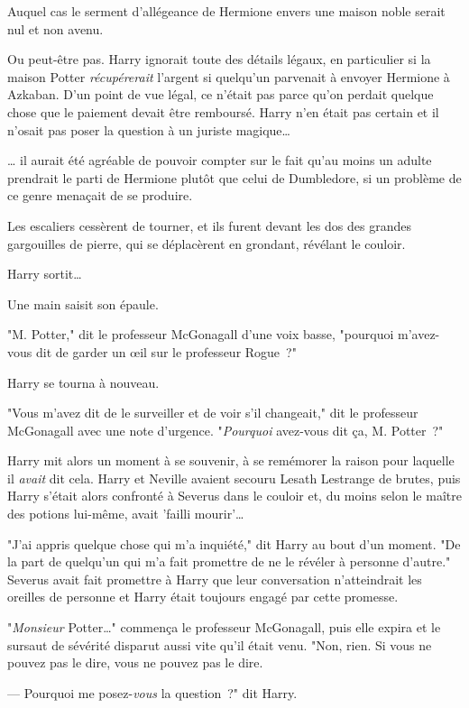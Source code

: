 Auquel cas le serment d'allégeance de Hermione envers une maison noble serait nul et non avenu.

Ou peut-être pas. Harry ignorait toute des détails légaux, en particulier si la maison Potter \emph{récupérerait} l'argent si quelqu'un parvenait à envoyer Hermione à Azkaban. D'un point de vue légal, ce n'était pas parce qu'on perdait quelque chose que le paiement devait être remboursé. Harry n'en était pas certain et il n'osait pas poser la question à un juriste magique…

… il aurait été agréable de pouvoir compter sur le fait qu'au moins un adulte prendrait le parti de Hermione plutôt que celui de Dumbledore, si un problème de ce genre menaçait de se produire.

Les escaliers cessèrent de tourner, et ils furent devant les dos des grandes gargouilles de pierre, qui se déplacèrent en grondant, révélant le couloir.

Harry sortit…

Une main saisit son épaule.

"M. Potter," dit le professeur McGonagall d'une voix basse, "pourquoi m'avez-vous dit de garder un œil sur le professeur Rogue~?"

Harry se tourna à nouveau.

"Vous m'avez dit de le surveiller et de voir s'il changeait," dit le professeur McGonagall avec une note d'urgence. "\emph{Pourquoi} avez-vous dit ça, M. Potter~?"

Harry mit alors un moment à se souvenir, à se remémorer la raison pour laquelle il \emph{avait} dit cela. Harry et Neville avaient secouru Lesath Lestrange de brutes, puis Harry s'était alors confronté à Severus dans le couloir et, du moins selon le maître des potions lui-même, avait 'failli mourir'…

"J'ai appris quelque chose qui m'a inquiété," dit Harry au bout d'un moment. "De la part de quelqu'un qui m'a fait promettre de ne le révéler à personne d'autre." Severus avait fait promettre à Harry que leur conversation n'atteindrait les oreilles de personne et Harry était toujours engagé par cette promesse.

"\emph{Monsieur} Potter…" commença le professeur McGonagall, puis elle expira et le sursaut de sévérité disparut aussi vite qu'il était venu. "Non, rien. Si vous ne pouvez pas le dire, vous ne pouvez pas le dire.

--- Pourquoi me posez-\emph{vous} la question~?" dit Harry.

